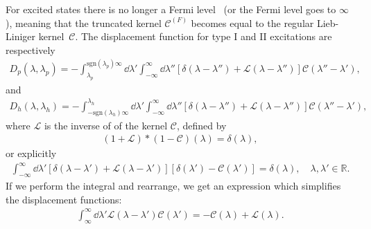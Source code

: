 \documentclass[11pt, a4paper]{report} %
\newcommand{\inversetruncc}{\mathcal{L}}
\newcommand{\kernel}{\mathcal{C}}
\begin{document}
For excited states there is no longer a Fermi level~\cite{tofind} (or the Fermi level goes to \(\infty\)), meaning that the truncated kernel \(\kernel^{(F)}\) becomes equal to the regular Lieb-Liniger kernel~\(\kernel\).
The displacement function for type I and II excitations are respectively~\cite{tofind}
\begin{align}
	D_p(\lambda, \lambda_p) = - \int_{\lambda_p}^{\textrm{sgn}(\lambda_p)\infty} \dd \lambda' \int_{-\infty}^{\infty} \dd  \lambda'' \left[\delta(\lambda-\lambda'') + \inversetruncc(\lambda-\lambda'') \right]\kernel(\lambda''-\lambda'),
\end{align}
and
\begin{align}
	D_h(\lambda, \lambda_h) = - \int_{-\textrm{sgn}(\lambda_h)\infty}^{\lambda_h} \dd \lambda' \int_{-\infty}^{\infty} \dd \lambda'' \left[\delta(\lambda-\lambda'') + \inversetruncc(\lambda - \lambda'') \right]\kernel(\lambda''-\lambda'),
\end{align}
where \(\inversetruncc\) is the inverse of of the kernel \(\kernel\), defined by~\cite{tofind}
\begin{align}
	(1+\inversetruncc)*(1-\kernel)(\lambda) = \delta(\lambda),
\end{align}
or explicitly
\begin{align}
	\int_{-\infty}^{\infty} \dd \lambda' \left[ \delta(\lambda-\lambda') + \inversetruncc(\lambda-\lambda') \right] \left[ \delta(\lambda') - \kernel(\lambda')\right] = \delta(\lambda), \quad \lambda, \lambda' \in \mathbb{R}.
\end{align}
If we perform the integral and rearrange, we get an expression which simplifies the displacement functions:
\begin{align}\label{eq:kernelinversion}
	\int_{\infty}^{\infty} \dd \lambda' \inversetruncc(\lambda-\lambda') \kernel(\lambda') = -\kernel(\lambda) + \inversetruncc(\lambda).
\end{align}
\end{document}
